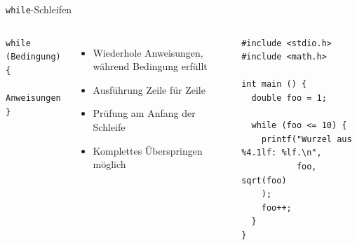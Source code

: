 
\begin{frame}[fragile]{\texttt{while}-Schleifen}
%
\begin{columns}[T]
\begin{codebox}[Syntax]
\begin{verbatim}
while (Bedingung) {
	Anweisungen
}
\end{verbatim}
%
\end{codebox}
\begin{itemize}
\item Wiederhole Anweisungen, während Bedingung erfüllt
\item Ausführung Zeile für Zeile
\item Prüfung am Anfang der Schleife
\item Komplettes Überspringen möglich
\end{itemize}
%
\begin{codebox}
\begin{verbatim}
#include <stdio.h>
#include <math.h>

int main () {
  double foo = 1;

  while (foo <= 10) {
    printf("Wurzel aus %4.1lf: %lf.\n", 
           foo, sqrt(foo)
    );
    foo++;
  }
}
\end{verbatim}
\end{codebox}
\end{columns}
%
\end{frame}



